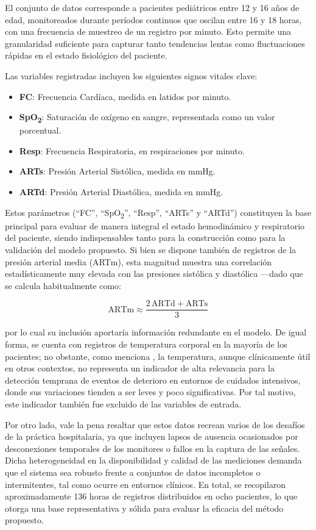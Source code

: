 El conjunto de datos corresponde a pacientes pediátricos entre 12 y 16 años de edad, monitoreados durante períodos continuos que oscilan entre 16 y 18 horas, con una frecuencia de muestreo de un registro por minuto. Esto permite una granularidad suficiente para capturar tanto tendencias lentas como fluctuaciones rápidas en el estado fisiológico del paciente.

Las variables registradas incluyen los siguientes signos vitales clave:

\begin{itemize}
    \item \textbf{FC}: Frecuencia Cardíaca, medida en latidos por minuto.
    \item \textbf{SpO\textsubscript{2}}: Saturación de oxígeno en sangre, representada como un valor porcentual.
    \item \textbf{Resp}: Frecuencia Respiratoria, en respiraciones por minuto.
    \item \textbf{ARTs}: Presión Arterial Sistólica, medida en mmHg.
    \item \textbf{ARTd}: Presión Arterial Diastólica, medida en mmHg.
\end{itemize}



Estos parámetros (“FC”, “SpO\textsubscript{2}”, “Resp”, “ARTs” y “ARTd”) constituyen la base principal para evaluar de manera integral el estado hemodinámico y respiratorio del paciente, siendo indispensables tanto para la construcción como para la validación del modelo propuesto. Si bien se dispone también de registros de la presión arterial media (ARTm), esta magnitud muestra una correlación estadísticamente muy elevada con las presiones sistólica y diastólica —dado que se calcula habitualmente como:

\[
\mathrm{ARTm} \approx \frac{2\,\mathrm{ARTd} + \mathrm{ARTs}}{3}
\]

por lo cual su inclusión aportaría información redundante en el modelo. De igual forma, se cuenta con registros de temperatura corporal en la mayoría de los pacientes; no obstante, como menciona \textcite{Vargas2023}, la temperatura, aunque clínicamente útil en otros contextos, no representa un indicador de alta relevancia para la detección temprana de eventos de deterioro en entornos de cuidados intensivos, donde sus variaciones tienden a ser leves y poco significativas. Por tal motivo, este indicador también fue excluido de las variables de entrada.

Por otro lado, vale la pena resaltar que estos datos recrean varios de los desafíos de la práctica hospitalaria, ya que incluyen lapsos de ausencia ocasionados por desconexiones temporales de los monitores o fallos en la captura de las señales. Dicha heterogeneidad en la disponibilidad y calidad de las mediciones demanda que el sistema sea robusto frente a conjuntos de datos incompletos o intermitentes, tal como ocurre en entornos clínicos. En total, se recopilaron aproximadamente 136 horas de registros distribuidos en ocho pacientes, lo que otorga una base representativa y sólida para evaluar la eficacia del método propuesto.





